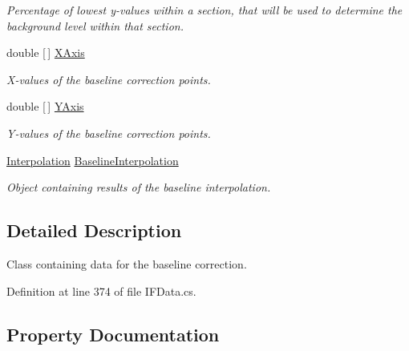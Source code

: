 \begin{DoxyCompactItemize}
\begin{DoxyCompactList}\small\item\em Percentage of lowest y-\/values within a section, that will be used to determine the background level within that section. \end{DoxyCompactList}\item 
double \mbox{[}$\,$\mbox{]} \mbox{\hyperlink{class_isotope_fit_1_1_i_f_data_1_1_baseline_corr_a90e35ea8c62d07f0279f4b5f7d440491}{X\+Axis}}
\begin{DoxyCompactList}\small\item\em X-\/values of the baseline correction points. \end{DoxyCompactList}\item 
double \mbox{[}$\,$\mbox{]} \mbox{\hyperlink{class_isotope_fit_1_1_i_f_data_1_1_baseline_corr_aa71067f79827da27836daa705413133c}{Y\+Axis}}
\begin{DoxyCompactList}\small\item\em Y-\/values of the baseline correction points. \end{DoxyCompactList}\item 
\mbox{\hyperlink{class_isotope_fit_1_1_interpolation}{Interpolation}} \mbox{\hyperlink{class_isotope_fit_1_1_i_f_data_1_1_baseline_corr_a914a7b2ac945482a7c73874fbff45951}{Baseline\+Interpolation}}
\begin{DoxyCompactList}\small\item\em Object containing results of the baseline interpolation. \end{DoxyCompactList}\end{DoxyCompactItemize}


\subsection{Detailed Description}
Class containing data for the baseline correction. 



Definition at line 374 of file I\+F\+Data.\+cs.



\subsection{Property Documentation}
\mbox{\label{class_isotope_fit_1_1_i_f_data_1_1_baseline_corr_a914a7b2ac945482a7c73874fbff45951}} 
